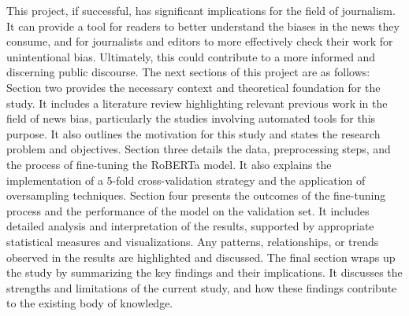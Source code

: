 \documentclass[11pt,a4paper]{article}
\begin{document}
This project, if successful, has significant implications for the field of journalism. It can provide a tool for readers to better understand the biases in the news they consume, and for journalists and editors to more effectively check their work for unintentional bias. Ultimately, this could contribute to a more informed and discerning public discourse.
The next sections of this project are as follows:
Section two provides the necessary context and theoretical foundation for the study. It includes a literature review highlighting relevant previous work in the field of news bias, particularly the studies involving automated tools for this purpose. It also outlines the motivation for this study and states the research problem and objectives. Section three details the data, preprocessing steps, and the process of fine-tuning the RoBERTa model. It also explains the implementation of a 5-fold cross-validation strategy and the application of oversampling techniques. Section four presents the outcomes of the fine-tuning process and the performance of the model on the validation set. It includes detailed analysis and interpretation of the results, supported by appropriate statistical measures and visualizations. Any patterns, relationships, or trends observed in the results are highlighted and discussed. The final section wraps up the study by summarizing the key findings and their implications. It discusses the strengths and limitations of the current study, and how these findings contribute to the existing body of knowledge.
\end{document}
